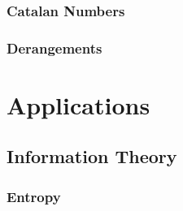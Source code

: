 \documentclass[11pt]{report} %
\begin{document}
\section{Catalan Numbers \cite{Lange2010}}

\section{Derangements}

\part{Applications}

\chapter{Information Theory}

\section{Entropy}
\end{document}
